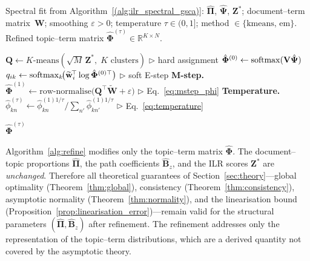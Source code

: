 \begin{algorithm}[t]
\caption{Topic--Term Refinement (post-spectral)}
\label{alg:refine}
\begin{algorithmic}[1]
\REQUIRE Spectral fit from Algorithm~\ref{(alg:ilr_spectral_gsca)}:
  $\hat{\boldsymbol{\Pi}}$, $\hat{\boldsymbol{\Psi}}$,
  $\mathbf{Z}^*$;\;
  document--term matrix~$\mathbf{W}$;\;
  smoothing $\varepsilon>0$;\;
  temperature $\tau\in(0,1]$;\;
  method $\in\{\text{kmeans},\,\text{em}\}$.
\ENSURE Refined topic--term matrix
  $\hat{\boldsymbol{\Phi}}^{(\tau)}
   \in\mathbb{R}^{K\times N}$.

\medskip
{}
  \STATE $\mathbf{Q} \leftarrow \text{$K$-means}
    (\sqrt{M}\,\mathbf{Z}^*,\; K\text{ clusters})$
  \hfill$\triangleright$ hard assignment
\ELSE
  \STATE $\hat{\boldsymbol{\Phi}}^{(0)} \leftarrow
    \operatorname{softmax}(\mathbf{V}\hat{\boldsymbol{\Psi}})$
  \STATE $q_{ik} \leftarrow
    \operatorname{softmax}_k\!\bigl(\widetilde{\mathbf{w}}_i^{\!\top}
    \log\hat{\boldsymbol{\Phi}}^{(0)\top}\bigr)$
  \hfill$\triangleright$ soft E-step
\ENDIF
\STATE \textbf{M-step.}\;
  $\hat{\boldsymbol{\Phi}}^{(1)} \leftarrow
    \text{row-normalise}\!\bigl(
      \mathbf{Q}^{\!\top}\widetilde{\mathbf{W}}
      + \varepsilon\bigr)$
  \hfill$\triangleright$ Eq.~\eqref{eq:mstep_phi}
\STATE \textbf{Temperature.}\;
  $\hat{\phi}^{(\tau)}_{kn} \leftarrow
    \hat{\phi}^{(1)1/\tau}_{kn}\big/
    \sum_{n'}\hat{\phi}^{(1)1/\tau}_{kn'}$
  \hfill$\triangleright$ Eq.~\eqref{eq:temperature}

\RETURN $\hat{\boldsymbol{\Phi}}^{(\tau)}$
\end{algorithmic}
\end{algorithm}

\begin{remark}
\label{rem:separation}
Algorithm~\ref{alg:refine} modifies only the topic--term matrix
$\hat{\boldsymbol{\Phi}}$. The document--topic proportions
$\hat{\boldsymbol{\Pi}}$, the path coefficients
$\hat{\mathbf{B}}_z$, and the ILR scores $\mathbf{Z}^*$ are
\emph{unchanged}. Therefore all theoretical guarantees of
Section~\ref{sec:theory}---global optimality
(Theorem~\ref{thm:global}), consistency
(Theorem~\ref{thm:consistency}), asymptotic normality
(Theorem~\ref{thm:normality}), and the linearisation bound
(Proposition~\ref{prop:linearisation_error})---remain valid for the
structural parameters
$(\hat{\boldsymbol{\Pi}},\hat{\mathbf{B}}_z)$ after refinement.
The refinement addresses only the representation of the
topic--term distributions, which are a derived quantity not covered
by the asymptotic theory.
\end{remark}

